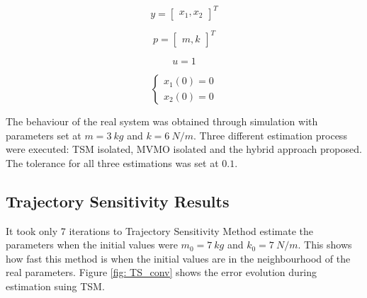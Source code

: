 \begin{equation}
	y = \begin{bmatrix}
		x_{1}, x_{2}
	\end{bmatrix}^ {T}
	\label{eq: SMoutput}
\end{equation}

\begin{equation}
	p = \begin{bmatrix}
		m, k
	\end{bmatrix}^ {T}
	\label{eq: SMp}
\end{equation}

\begin{equation}
	u = 1
	\label{eq: SMinput}
\end{equation}

\begin{equation}
	\begin{cases}
		x_{1}(0) = 0 \\
		x_{2}(0) = 0
	\end{cases}
	\label{eq: SMinitcond}
\end{equation}

The behaviour of the real system was obtained through simulation with parameters set at $m = 3\ kg$ and $k = 6\ N/m$. Three different estimation process were executed: TSM isolated, MVMO isolated and the hybrid approach proposed. The tolerance for all three estimations was set at $0.1$.

\subsection{Trajectory Sensitivity Results}

It took only 7 iterations to Trajectory Sensitivity Method estimate the parameters when the initial values were $m_{0} = 7\ kg$ and $k_{0} = 7\ N/m$. This shows how fast this method is when the initial values are in the neighbourhood of the real parameters. Figure \ref{fig: TS_conv} shows the error evolution during estimation suing TSM.

